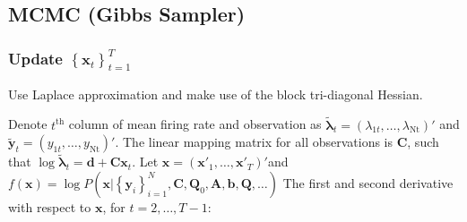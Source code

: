 \documentclass[]{article}
\begin{document}
\subsection{MCMC (Gibbs Sampler)}

\subsubsection{Update \(\left\{ \mathbf{x}_{t} \right\}_{t=1}^T\)}
Use Laplace approximation and make use of the block tri-diagonal Hessian.

Denote \(t^{\text{th}}\) column of mean firing rate and observation as \({\widetilde{\bm{\lambda}}}_{t} = \left( \lambda_{1t},\ldots,\lambda_{\text{Nt}} \right)'\)
and \({\widetilde{\mathbf{y}}}_{t} = (y_{1t},\ldots,y_{\text{Nt}})'\).
The linear mapping matrix for all observations is \(\mathbf{C}\), such that
\(\log{\widetilde{\bm{\lambda}}}_{t} = \mathbf{d} + \mathbf{C}\mathbf{x}_{t}\).
Let \(\mathbf{x} = \left( \mathbf{x'}_{1},\ldots,\mathbf{x'}_{T} \right)'\)and
\(f\left( \mathbf{x} \right) = \log{P(\mathbf{x}|\left\{ \mathbf{y}_{i} \right\}_{i = 1}^{N},\mathbf{C},\mathbf{Q}_{0},\mathbf{A},\mathbf{b},\mathbf{Q},\ldots)}\)
The first and second derivative with respect to \(\mathbf{x}\), for \(t=2, \ldots, T-1\):
\end{document}

